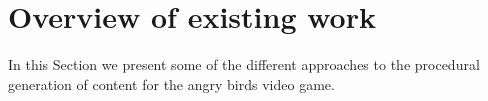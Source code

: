 \documentclass[conference]{IEEEtran}
\begin{document}
%












\section{Overview of existing work}

In this Section we present some of the different approaches to the procedural
generation of content for the angry birds video game.
\end{document}
